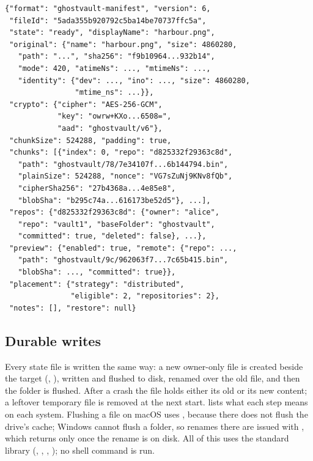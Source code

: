 \begin{lstlisting}[language=gvjson,caption={A record of a ghost with ten chunks, abridged; the
values are from a real run against the simulated GitHub.},label={lst:record}]
{"format": "ghostvault-manifest", "version": 6,
 "fileId": "5ada355b920792c5ba14be70737ffc5a",
 "state": "ready", "displayName": "harbour.png",
 "original": {"name": "harbour.png", "size": 4860280,
   "path": "...", "sha256": "f9b10964...932b14",
   "mode": 420, "atimeNs": ..., "mtimeNs": ...,
   "identity": {"dev": ..., "ino": ..., "size": 4860280,
                "mtime_ns": ...}},
 "crypto": {"cipher": "AES-256-GCM",
            "key": "owrw+KXo...6508=",
            "aad": "ghostvault/v6"},
 "chunkSize": 524288, "padding": true,
 "chunks": [{"index": 0, "repo": "d825332f29363c8d",
   "path": "ghostvault/78/7e34107f...6b144794.bin",
   "plainSize": 524288, "nonce": "VG7sZuNj9KNv8fQb",
   "cipherSha256": "27b4368a...4e85e8",
   "blobSha": "b295c74a...616173be52d5"}, ...],
 "repos": {"d825332f29363c8d": {"owner": "alice",
   "repo": "vault1", "baseFolder": "ghostvault",
   "committed": true, "deleted": false}, ...},
 "preview": {"enabled": true, "remote": {"repo": ...,
   "path": "ghostvault/9c/962063f7...7c65b415.bin",
   "blobSha": ..., "committed": true}},
 "placement": {"strategy": "distributed",
               "eligible": 2, "repositories": 2},
 "notes": [], "restore": null}
\end{lstlisting}

\subsection{Durable writes}\label{sec:durable}
Every state file is written the same way: a new owner-only file is created beside the target
(, ), written and flushed to disk, renamed over the old file, and
then the folder is flushed. After a crash the file holds either its old or its new content; a
leftover temporary file is removed at the next start.  lists what each step
means on each system. Flushing a file on macOS uses , because  there
does not flush the drive's cache; Windows cannot flush a folder, so renames there are issued with
, which returns only once the rename is on disk. All of this uses
the standard library (, , , ); no shell command is run.

